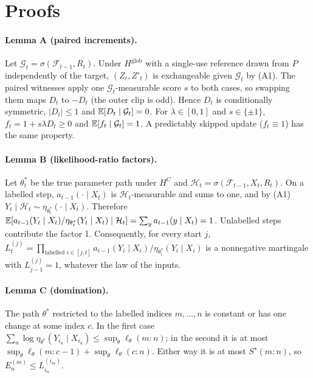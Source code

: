 \appendix

\section{Proofs}
\label{app:proofs}

\paragraph{Lemma A (paired increments).} Let $\mathcal G_t=\sigma(\mathcal F_{t-1},R_t)$. Under $H^{\mathrm{glob}}$ with a single-use reference drawn from $P$ independently of the target, $(Z_t,Z'_t)$ is exchangeable given $\mathcal G_t$ by (A1). The paired witnesses apply one $\mathcal G_t$-measurable score $s$ to both cases, so swapping them maps $D_t$ to $-D_t$ (the outer clip is odd). Hence $D_t$ is conditionally symmetric, $|D_t|\le1$ and $\mathbb{E}[D_t\mid\mathcal G_t]=0$. For $\lambda\in[0,1]$ and $s\in\{\pm1\}$, $f_t=1+s\lambda D_t\ge0$ and $\mathbb{E}[f_t\mid\mathcal G_t]=1$. A predictably skipped update ($f_t\equiv1$) has the same property.

\paragraph{Lemma B (likelihood-ratio factors).} Let $\theta^\ast_t$ be the true parameter path under $H^C$ and $\mathcal H_t=\sigma(\mathcal F_{t-1},X_t,R_t)$. On a labelled step, $a_{t-1}(\cdot\mid X_t)$ is $\mathcal H_t$-measurable and sums to one, and by (A1) $Y_t\mid\mathcal H_t\sim\eta_{\theta^\ast_t}(\cdot\mid X_t)$. Therefore $\mathbb{E}[a_{t-1}(Y_t\mid X_t)/\eta_{\theta^\ast_t}(Y_t\mid X_t)\mid\mathcal H_t]=\sum_y a_{t-1}(y\mid X_t)=1$. Unlabelled steps contribute the factor 1. Consequently, for every start $j$, $L^{(j)}_t=\prod_{\text{labelled } i\in[j,t]}a_{i-1}(Y_i\mid X_i)/\eta_{\theta^\ast_i}(Y_i\mid X_i)$ is a nonnegative martingale with $L^{(j)}_{j-1}=1$, whatever the law of the inputs.

\paragraph{Lemma C (domination).} The path $\theta^\ast$ restricted to the labelled indices $m,\dots,n$ is constant or has one change at some index $c$. In the first case $\sum_u\log\eta_{\theta^\ast}(Y_{i_u}\mid X_{i_u})\le\sup_\theta\ell_\theta(m{:}n)$; in the second it is at most $\sup_\theta\ell_\theta(m{:}c-1)+\sup_\theta\ell_\theta(c{:}n)$. Either way it is at most $S^\star(m{:}n)$, so $E^{(m)}_n\le L^{(i_m)}_{i_n}$.

